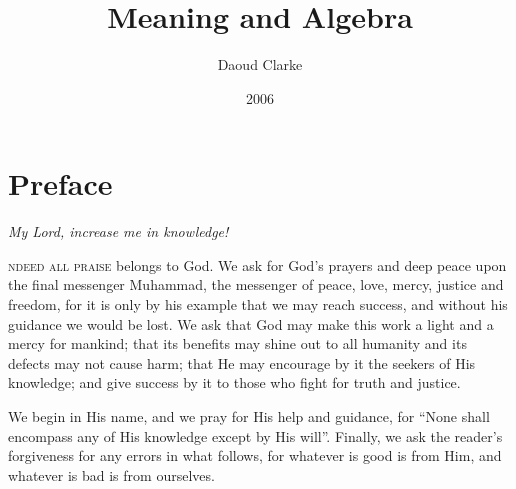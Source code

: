 \documentclass[a4paper,oneside,12pt]{report}
\title{Meaning and Algebra}
\author{Daoud Clarke}
\date{2006}
\begin{document}
\maketitle


 \chapter*{Preface}

\textsf{\textsl{My Lord, increase me in knowledge!}}
\newline

\textsc{ndeed all praise} belongs to God. We ask for God's prayers and deep peace upon the final 
messenger Muhammad, the messenger of peace, love, mercy, justice and freedom, for it is only by his example that we may reach success, and without his guidance we would be lost. We ask that God may make this work a light and a mercy for mankind; that its benefits may shine out to all humanity and its defects may not cause harm; that He may encourage by it the seekers of His knowledge; and give success by it to those who fight for truth and justice.
 
 We begin in His name, and we pray for His help and guidance, for ``None shall encompass any of His knowledge except by His will''.  Finally, we ask the reader's forgiveness for any errors in what follows, for whatever is good is from Him, and whatever is bad is from ourselves. 

%

\tableofcontents

%



\end{document}

